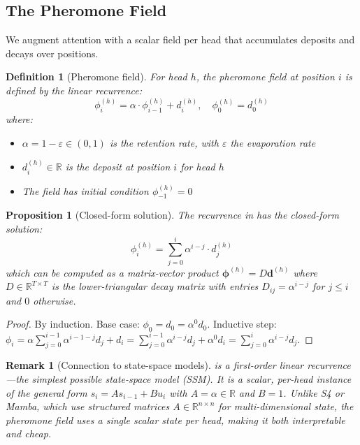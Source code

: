 \documentclass[11pt,a4paper]{article}
\newtheorem{definition}{Definition}
\newtheorem{proposition}{Proposition}
\newtheorem{remark}{Remark}
\newcommand{\field}{\bm{\phi}}
\newcommand{\deposit}{\bm{d}}
\newcommand{\evap}{\varepsilon}
\newcommand{\retain}{\alpha}
\newcommand{\R}{\mathbb{R}}
\begin{document}
\subsection{The Pheromone Field}

We augment attention with a scalar field per head that accumulates
deposits and decays over positions.

\begin{definition}[Pheromone field]
\label{def:field}
For head $h$, the \emph{pheromone field} at position $i$ is defined
by the linear recurrence:
\begin{equation}
    \phi_i^{(h)} = \retain \cdot \phi_{i-1}^{(h)} + d_i^{(h)},
    \quad \phi_0^{(h)} = d_0^{(h)}
    \label{eq:field_recurrence}
\end{equation}
where:
\begin{itemize}
    \item $\retain = 1 - \evap \in (0, 1)$ is the \emph{retention rate},
          with $\evap$ the \emph{evaporation rate}
    \item $d_i^{(h)} \in \R$ is the \emph{deposit} at position $i$ for head $h$
    \item The field has initial condition $\phi_{-1}^{(h)} = 0$
\end{itemize}
\end{definition}

\begin{proposition}[Closed-form solution]
\label{prop:closedform}
The recurrence in  has the closed-form solution:
\begin{equation}
    \phi_i^{(h)} = \sum_{j=0}^{i} \retain^{i-j} \cdot d_j^{(h)}
    \label{eq:field_closedform}
\end{equation}
which can be computed as a matrix-vector product $\field^{(h)} = D \deposit^{(h)}$
where $D \in \R^{T \times T}$ is the lower-triangular decay matrix with
entries $D_{ij} = \retain^{i-j}$ for $j \leq i$ and $0$ otherwise.
\end{proposition}

\begin{proof}
By induction. Base case: $\phi_0 = d_0 = \retain^0 d_0$. Inductive step:
$\phi_i = \retain \sum_{j=0}^{i-1} \retain^{i-1-j} d_j + d_i
= \sum_{j=0}^{i-1} \retain^{i-j} d_j + \retain^0 d_i
= \sum_{j=0}^{i} \retain^{i-j} d_j$.
\end{proof}

\begin{remark}[Connection to state-space models]
 is a first-order linear recurrence---the
simplest possible state-space model (SSM). It is a scalar, per-head
instance of the general form $s_i = A s_{i-1} + B u_i$ with
$A = \retain \in \R$ and $B = 1$. Unlike S4 or Mamba, which use
structured matrices $A \in \R^{n \times n}$ for multi-dimensional
state, the pheromone field uses a single scalar state per head,
making it both interpretable and cheap.
\end{remark}
\end{document}
